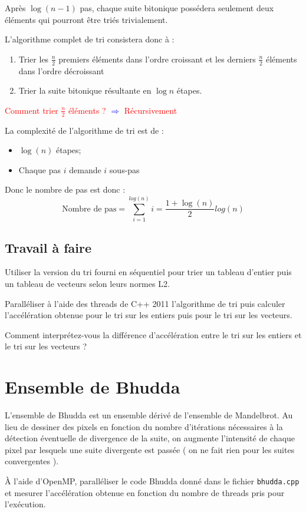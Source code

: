 \documentclass[11pt,a4paper]{article}
\begin{document}
Après $\log(n-1)$ pas, chaque suite bitonique possédera seulement
deux éléments qui pourront être triés trivialement.

L'algorithme complet de tri consistera donc à :
\begin{enumerate}
\item Trier les $\frac{n}{2}$ premiers éléments dans l'ordre croissant et les
derniers $\frac{n}{2}$ éléments dans l'ordre décroissant
\item Trier la suite bitonique résultante en $\log{n}$ étapes.
\end{enumerate}

\textcolor{red}{Comment trier $\frac{n}{2}$ éléments ?} {\Large\textcolor{blue}{$\Rightarrow$}} \textcolor{red}{Récursivement}

La complexité de l'algorithme de tri est de :
\begin{itemize}
\item $\log(n)$ étapes;
\item Chaque pas $i$ demande $i$ sous-pas
\end{itemize}
Donc le nombre de pas est donc :
\[
\mbox{Nombre de pas} = \sum_{i=1}^{log(n)} i = \frac{1+\log(n)}{2}log(n)
\]

\subsection{Travail à faire}

Utiliser la version du tri fourni en séquentiel pour trier un tableau d'entier
puis un tableau de vecteurs selon leurs normes L2.

Paralléliser à l'aide des threads de C++ 2011 l'algorithme de tri puis calculer
l'accélération obtenue pour le tri sur les entiers puis pour le tri sur les vecteurs.

Comment interprétez-vous la différence d'accélération entre le tri sur les entiers et
le tri  sur les vecteurs ?

\section{Ensemble de Bhudda}

L'ensemble de Bhudda est un ensemble dérivé de l'ensemble de Mandelbrot. Au lieu de dessiner des pixels en fonction du nombre d'itérations nécessaires à la détection éventuelle de divergence de la suite, on augmente l'intensité de chaque pixel par lesquels une suite divergente est passée ( on ne fait rien pour les suites convergentes ).

\`A l'aide d'OpenMP, paralléliser le code Bhudda donné dans le fichier \texttt{bhudda.cpp} et mesurer
l'accélération obtenue en fonction du nombre de threads pris pour l'exécution.
\end{document}
